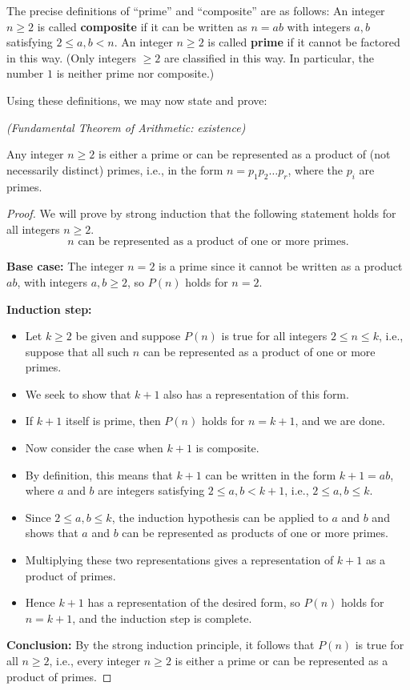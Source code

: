 The precise definitions of ``prime'' and ``composite'' are as follows:
An integer $n\ge2$ is called \textbf{composite}
if it can be written as $n=ab$
with integers $a,b$ satisfying $2\le a,b<n$.
An integer $n\ge 2$ is called \textbf{prime} if it cannot 
be factored in this way.
(Only integers $\ge2$ are classified in this way. In
particular, the number $1$ is neither prime nor composite.)

Using these definitions, we may now state and prove:

\begin{prop}{}\emph{(Fundamental Theorem of Arithmetic: existence)}

Any integer $n\ge 2$
is either a prime or can be represented as a product of (not
necessarily distinct) primes, i.e., in the form $n=p_1p_2\dots p_r$,
where the $p_i$ are primes.
\end{prop}

\begin{proof}
We will prove by strong induction that the following statement  
holds for all integers $n\ge2$.
\[
\text{$n$ can be represented as a product of one or more primes.}
\tag{$P(n)$}
\]

\textbf{Base case:} The integer $n=2$ is a prime since it cannot be
written as a product $ab$, with integers $a,b\ge 2$,  so $P(n)$ holds
for $n=2$.


\textbf{Induction step:} 
\begin{itemize}

\item Let $k\ge2$ be given and suppose $P(n)$ is true for all 
integers $2\le n\le k$, i.e., suppose that all such $n$ can be represented 
as a product of one or more primes.
\item We seek to show that $k+1$ also has a
representation of this form.
\item
If $k+1$ itself is prime, then $P(n)$ holds for $n=k+1$, and we are done.
\item
Now consider the case when $k+1$ is composite.
\item 
By definition, this means that $k+1$
can be written in the form $k+1=ab$, where $a$ and $b$ are integers satisfying
$2\le a,b< k+1$, i.e., $2\le a,b\le k$. 
\item
Since $2\le a,b\le k$, the induction hypothesis can be applied to $a$ and $b$
and shows that $a$ and $b$ can be represented as products
of one or more primes.
\item
Multiplying these two representations gives a representation of $k+1$ as
a product of primes. 
\item
Hence $k+1$ has a representation of the desired form, so $P(n)$ holds
for $n=k+1$, and the induction step is
complete.
\end{itemize}

\textbf{Conclusion:} By the strong induction principle, 
it follows that $P(n)$  is true for all $n\ge2$, i.e., every integer
$n\ge2$ is either a prime or can be represented as a product of primes.
\end{proof}

